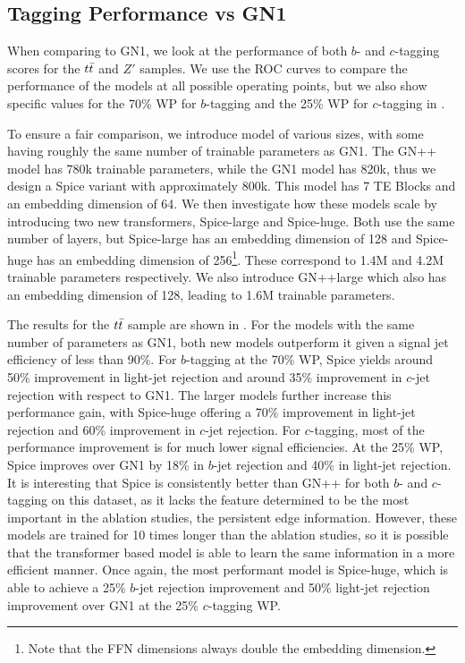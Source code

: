 \subsection{Tagging Performance vs GN1}

When comparing to GN1, we look at the performance of both $b$- and $c$-tagging scores for the $t\bar{t}$ and $Z'$ samples.
We use the ROC curves to compare the performance of the models at all possible operating points, but we also show specific values for the 70\% WP for $b$-tagging and the 25\% WP for $c$-tagging in .

To ensure a fair comparison, we introduce model of various sizes, with some having roughly the same number of trainable parameters as GN1.
The GN++ model has 780k trainable parameters, while the GN1 model has 820k, thus we design a Spice variant with approximately 800k.
This model has 7 TE Blocks and an embedding dimension of 64.
We then investigate how these models scale by introducing two new transformers, Spice-large and Spice-huge.
Both use the same number of layers, but Spice-large has an embedding dimension of 128 and Spice-huge has an embedding dimension of 256\footnote{Note that the FFN dimensions always double the embedding dimension.}.
These correspond to 1.4M and 4.2M trainable parameters respectively.
We also introduce GN++large which also has an embedding dimension of 128, leading to 1.6M trainable parameters.

The results for the $t\bar{t}$ sample are shown in .
For the models with the same number of parameters as GN1, both new models outperform it given a signal jet efficiency of less than 90\%.
For $b$-tagging at the 70\% WP, Spice yields around 50\% improvement in light-jet rejection and around 35\% improvement in $c$-jet rejection with respect to GN1.
The larger models further increase this performance gain, with Spice-huge offering a 70\% improvement in light-jet rejection and 60\% improvement in $c$-jet rejection.
For $c$-tagging, most of the performance improvement is for much lower signal efficiencies.
At the 25\% WP, Spice improves over GN1 by 18\% in $b$-jet rejection and 40\% in light-jet rejection.
It is interesting that Spice is consistently better than GN++ for both $b$- and $c$-tagging on this dataset, as it lacks the feature determined to be the most important in the ablation studies, the persistent edge information.
However, these models are trained for 10 times longer than the ablation studies, so it is possible that the transformer based model is able to learn the same information in a more efficient manner.
Once again, the most performant model is Spice-huge, which is able to achieve a 25\% $b$-jet rejection improvement and 50\% light-jet rejection improvement over GN1 at the 25\% $c$-tagging WP.

